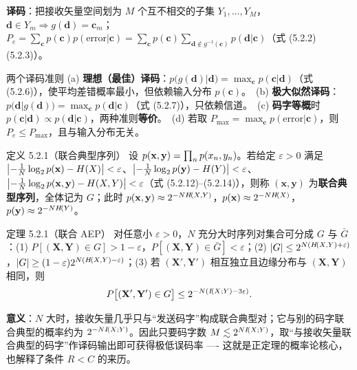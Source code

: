 \textbf{译码}：把接收矢量空间划为 $M$ 个互不相交的子集 $Y_1,\dots,Y_M$，$\mathbf{d}\in Y_m\Rightarrow g(\mathbf{d})=\mathbf{c}_m$；
$P_e=\sum_{\mathbf{c}}p(\mathbf{c})p(\text{error}|\mathbf{c})=\sum_{\mathbf{c}}p(\mathbf{c})\sum_{\mathbf{d}\notin g^{-1}(\mathbf{c})}p(\mathbf{d}|\mathbf{c})$（式 (5.2.2)(5.2.3)）。

\begin{thmbox}{两个译码准则}
(a) \textbf{理想（最佳）译码}：$p\bigl(g(\mathbf{d})|\mathbf{d}\bigr)=\max_{\mathbf{c}}p(\mathbf{c}|\mathbf{d})$（式 (5.2.6)），使平均差错概率最小，但依赖输入分布 $p(\mathbf{c})$。\ (b) \textbf{极大似然译码}：$p\bigl(\mathbf{d}|g(\mathbf{d})\bigr)=\max_{\mathbf{c}}p(\mathbf{d}|\mathbf{c})$（式 (5.2.7)），只依赖信道。\ (c) \textbf{码字等概}时 $p(\mathbf{c}|\mathbf{d})\propto p(\mathbf{d}|\mathbf{c})$，两种准则\textbf{等价}。\ (d) 若取 $P_{\max}=\max_{\mathbf{c}}p(\text{error}|\mathbf{c})$，则 $P_e\le P_{\max}$，且与输入分布无关。
\end{thmbox}

\begin{defbox}{定义 5.2.1（联合典型序列）}
设 $p\!\left(\mathbf{x},\mathbf{y}\right)=\prod_np\!\left(x_n,y_n\right)$。若给定 $\varepsilon>0$ 满足
$\bigl|-\frac1N\log_{2}p\!\left(\mathbf{x}\right)-H\!\left(X\right)\bigr|<\varepsilon$、$\bigl|-\frac1N\log_{2}p\!\left(\mathbf{y}\right)-H\!\left(Y\right)\bigr|<\varepsilon$、$\bigl|-\frac1N\log_{2}p\!\left(\mathbf{x},\mathbf{y}\right)-H\!\left(X,Y\right)\bigr|<\varepsilon$（式 (5.2.12)--(5.2.14)），则称 $(\mathbf{x},\mathbf{y})$ 为\textbf{联合典型序列}，全体记为 $G$；此时 $p\!\left(\mathbf{x},\mathbf{y}\right)\approx2^{-NH\!\left(X,Y\right)}$，$p\!\left(\mathbf{x}\right)\approx2^{-NH\!\left(X\right)}$，$p\!\left(\mathbf{y}\right)\approx2^{-NH\!\left(Y\right)}$。
\end{defbox}

\begin{thmbox}{定理 5.2.1（联合 AEP）}
对任意小 $\varepsilon>0$，$N$ 充分大时序列对集合可分成 $G$ 与 $\bar G$：(1) $P[(\mathbf{X},\mathbf{Y})\in G]>1-\varepsilon$，$P[(\mathbf{X},\mathbf{Y})\in\bar G]<\varepsilon$；(2) $|G|\le2^{N(H\!\left(X,Y\right)+\varepsilon)}$，$|G|\ge(1-\varepsilon)2^{N(H\!\left(X,Y\right)-\varepsilon)}$；(3) 若 $(\mathbf{X}',\mathbf{Y}')$ 相互独立且边缘分布与 $(\mathbf{X},\mathbf{Y})$ 相同，则
\begin{equation*}
P\bigl[(\mathbf{X}',\mathbf{Y}')\in G\bigr]\le2^{-N(I\!\left(X;Y\right)-3\varepsilon)} .
\end{equation*}
\end{thmbox}

\textbf{意义}：$N$ 大时，接收矢量几乎只与“发送码字”构成联合典型对；它与别的码字联合典型的概率约为 $2^{-NI\!\left(X;Y\right)}$。因此只要码字数 $M\lesssim 2^{NI\!\left(X;Y\right)}$，取“与接收矢量联合典型的码字”作译码输出即可获得极低误码率 ---- 这就是正定理的概率论核心，也解释了条件 $R<C$ 的来历。

